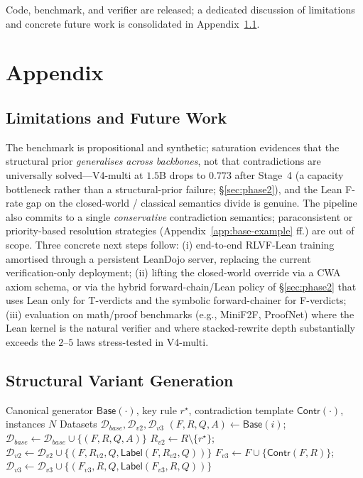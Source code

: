 \documentclass{article}
\begin{document}
Code, benchmark, and verifier are released; a dedicated discussion of limitations and concrete future work is consolidated in Appendix~\ref{app:limitations}.





\appendix
\section{Appendix}

\subsection{Limitations and Future Work}
\label{app:limitations}

The benchmark is propositional and synthetic; saturation evidences that the structural prior \emph{generalises across backbones}, not that contradictions are universally solved---V4-multi at $1.5$B drops to $0.773$ after Stage~4 (a capacity bottleneck rather than a structural-prior failure; \S\ref{sec:phase2}), and the Lean F-rate gap on the closed-world / classical semantics divide is genuine. The pipeline also commits to a single \emph{conservative} contradiction semantics; paraconsistent or priority-based resolution strategies (Appendix~\ref{app:base-example} ff.) are out of scope. Three concrete next steps follow: (i) end-to-end RLVF-Lean training amortised through a persistent LeanDojo server, replacing the current verification-only deployment; (ii) lifting the closed-world override via a CWA axiom schema, or via the hybrid forward-chain/Lean policy of \S\ref{sec:phase2} that uses Lean only for T-verdicts and the symbolic forward-chainer for F-verdicts; (iii) evaluation on math/proof benchmarks (e.g., MiniF2F, ProofNet) where the Lean kernel is the natural verifier and where stacked-rewrite depth substantially exceeds the $2$--$5$ laws stress-tested in V4-multi.

\subsection{Structural Variant Generation}
\label{app:variant-gen}

\begin{algorithm}[h]
\caption{Structural Variant Generation (Variant 2 \& 3)}
\label{alg:variant23}
\small
\begin{algorithmic}[1]
\Require Canonical generator $\mathsf{Base}(\cdot)$, key rule $r^\star$, contradiction template $\mathsf{Contr}(\cdot)$, instances $N$
\Ensure Datasets $\mathcal{D}_{base}, \mathcal{D}_{v2}, \mathcal{D}_{v3}$
    \State $(F,R,Q,A) \gets \mathsf{Base}(i)$;\quad $\mathcal{D}_{base} \gets \mathcal{D}_{base} \cup \{(F,R,Q,A)\}$
    \State $R_{v2} \gets R \setminus \{r^\star\}$;\quad $\mathcal{D}_{v2} \gets \mathcal{D}_{v2} \cup \{(F,R_{v2},Q,\mathsf{Label}(F,R_{v2},Q))\}$
    \State $F_{v3} \gets F \cup \{\mathsf{Contr}(F,R)\}$;\quad $\mathcal{D}_{v3} \gets \mathcal{D}_{v3} \cup \{(F_{v3},R,Q,\mathsf{Label}(F_{v3},R,Q))\}$
\EndFor
\end{algorithmic}
\end{algorithm}
\end{document}
